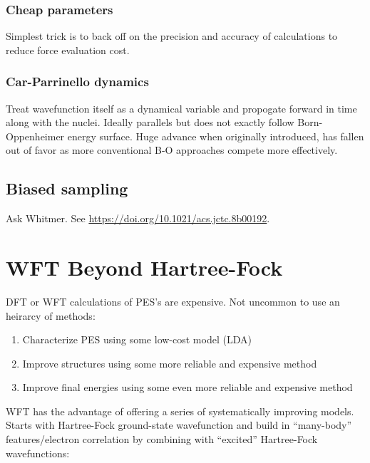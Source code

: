 \documentclass[11pt]{article}
\begin{document}
\subsubsection{Cheap parameters}
\label{sec:orga15b11d}
Simplest trick is to back off on the precision and accuracy of calculations to reduce force evaluation cost.
\subsubsection{Car-Parrinello dynamics}
\label{sec:org3022044}
Treat wavefunction itself as a dynamical variable and propogate forward in time along with the nuclei. Ideally parallels but does not exactly follow Born-Oppenheimer energy surface.  Huge advance when originally introduced, has fallen out of favor as more conventional B-O approaches compete more effectively.
\subsection{Biased sampling}
\label{sec:org3dec5d3}
Ask Whitmer.  See \url{https://doi.org/10.1021/acs.jctc.8b00192}.
\newpage

\section{WFT Beyond Hartree-Fock}
\label{sec:orgf0223ca}
DFT or WFT calculations of PES's are expensive.  Not uncommon to use an heirarcy of methods:
\begin{enumerate}
\item Characterize PES using some low-cost model (LDA)
\item Improve structures using some more reliable and expensive method
\item Improve final energies using some even more reliable and expensive method
\end{enumerate}

WFT has the advantage of offering a series of systematically improving models. Starts with Hartree-Fock ground-state wavefunction and build in ``many-body'' features/electron correlation by combining with ``excited'' Hartree-Fock wavefunctions:
\end{document}
